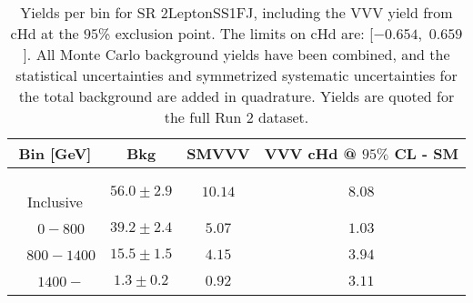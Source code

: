 \begin{table}[!htbp]
    \small
    \center
    \begin{tabular}{c||c|c|c}
    Bin [GeV] & Bkg & SMVVV & \pbox{20cm}{VVV \\ cHd @ $95\%$ CL - SM \\ }\\
    \hline
    \pbox{20cm}{ ~ \\Inclusive\\ } & $56.0 \pm 2.9$ & $10.14$ & $8.08$\\
    \hline
    \pbox{20cm}{ ~ \\$0-800$\\ } & $39.2 \pm 2.4$ & $5.07$ & $1.03$\\
    \hline
    \pbox{20cm}{ ~ \\$800-1400$\\ } & $15.5 \pm 1.5$ & $4.15$ & $3.94$\\
    \hline
    \pbox{20cm}{ ~ \\$1400-$\\ } & $1.3 \pm 0.2$ & $0.92$ & $3.11$\\
\end{tabular}
    \caption{Yields per bin for SR 2LeptonSS1FJ, including the VVV yield from cHd at the $95$\% exclusion point. The limits on cHd are: [$-0.654$,~$0.659$]. All Monte Carlo background yields have been combined, and the statistical uncertainties and symmetrized systematic uncertainties for the total background are added in quadrature. Yields are quoted for the full Run 2 dataset.}
    \label{tab:2LeptonSS1FJ$binssignal}
\end{table}
